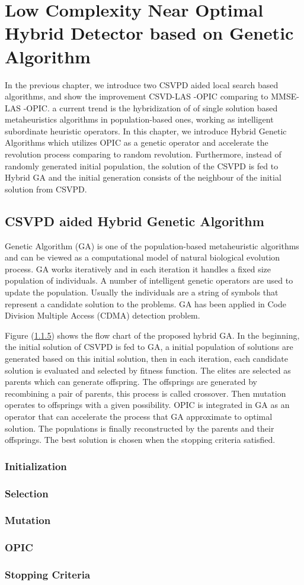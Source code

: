 \resetdatestamp

\chapter{Low Complexity Near Optimal Hybrid Detector based on Genetic Algorithm}\label{Chapter GA}
In the previous chapter, we introduce two CSVPD aided local search based algorithms, and show the improvement CSVD-LAS -OPIC comparing to MMSE-LAS -OPIC.    
a current trend is the hybridization of of single solution based metaheuristics algorithms in population-based ones, working as intelligent subordinate heuristic operators. In this chapter, we introduce Hybrid Genetic Algorithms which utilizes OPIC as a genetic operator and accelerate the revolution process comparing to random revolution. Furthermore, instead of randomly generated initial population, the solution of the CSVPD is fed to Hybrid GA and the initial generation consists of the neighbour of the initial solution from CSVPD.  
\section{CSVPD aided Hybrid Genetic Algorithm}
Genetic Algorithm (GA) is one of the population-based metaheuristic algorithms and can be viewed as a computational model of natural biological evolution process. GA works iteratively and in each iteration it handles a fixed size population of individuals. A number of intelligent genetic operators are used to update the population. Usually the individuals are a string of symbols that represent a candidate solution to the problems. GA has been applied in Code Division Multiple Access (CDMA) detection problem\cite{juntti1997genetic}\cite{ergun2000multiuser}.  

Figure (\ref{}) shows the flow chart of the proposed hybrid GA. In the beginning, the initial solution of CSVPD is fed to GA, a initial population of solutions are generated based on this initial solution, then in each iteration, each candidate solution is evaluated and selected by fitness function. The elites are selected as parents which can generate offspring. The offsprings are generated by recombining a pair of parents, this process is called crossover. Then mutation operates to offsprings with a given possibility. OPIC is integrated in GA as an operator that can accelerate the process that GA approximate to optimal solution. The populations is finally reconstructed by the parents and their offsprings. The best solution is chosen when the stopping criteria satisfied.

\subsection{Initialization}
\subsection{Selection}
\subsection{Mutation}
\subsection{OPIC} 
\subsection{Stopping Criteria}
 